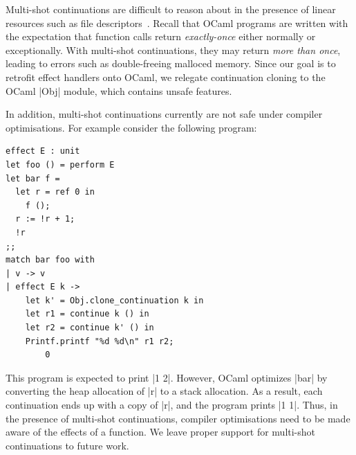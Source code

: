 \documentclass[sigplan,screen]{acmart}
\begin{document}
Multi-shot continuations are difficult to
reason about in the presence of linear resources such as file descriptors~\cite{de-vilhena-pottier-21}.
Recall that OCaml programs are written with the expectation that function calls
return \emph{exactly-once} either normally or exceptionally. With multi-shot
continuations, they may return \emph{more than once}, leading to errors such as
double-freeing malloced memory. Since our goal is to retrofit effect handlers
onto OCaml, we relegate continuation cloning to the OCaml |Obj| module, which
contains unsafe features.

In addition, multi-shot continuations currently are not safe under compiler
optimisations. For example consider the following program:

\begin{minipage}{\linewidth}
\begin{lstlisting}
effect E : unit
let foo () = perform E
let bar f =
  let r = ref 0 in
	f ();
  r := !r + 1;
  !r
;;
match bar foo with
| v -> v
| effect E k ->
    let k' = Obj.clone_continuation k in
    let r1 = continue k () in
    let r2 = continue k' () in
    Printf.printf "%d %d\n" r1 r2;
		0
\end{lstlisting}
\end{minipage}

This program is expected to print |1 2|. However, OCaml optimizes |bar| by
converting the heap allocation of |r| to a stack allocation. As a result, each
continuation ends up with a copy of |r|, and the program prints |1 1|. Thus, in
the presence of multi-shot continuations, compiler optimisations need to be
made aware of the effects of a function. We leave proper support for multi-shot
continuations to future work.
\fi
\end{document}
